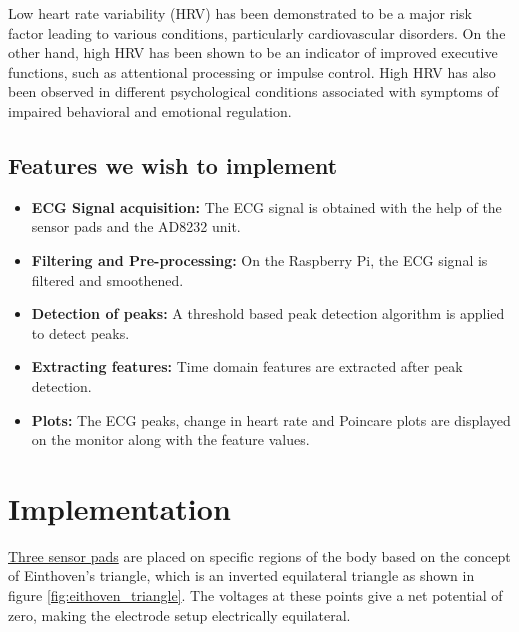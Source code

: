 \documentclass[11pt]{article}
\theoremstyle{definition}
\begin{document}
Low heart rate variability (HRV) has been demonstrated to be a major risk factor leading to various conditions, particularly cardiovascular disorders\cite{kamath1987heart}.
  On the other hand, high HRV has been shown to be an indicator of improved executive functions, such as attentional processing or impulse control\cite{appelhans2006heart, thayer2005psychosomatics}.
  High HRV has also been observed in different psychological conditions associated with symptoms of impaired behavioral and emotional regulation\cite{thayer2009claude, schulz2008negative}.


  \subsection{Features we wish to implement}
  \begin{itemize}
  \item \textbf{ECG Signal acquisition:} The ECG signal is obtained with the help of the sensor pads and the AD8232 unit.
  \item \textbf{Filtering and Pre-processing:} On the Raspberry Pi, the ECG signal is filtered and smoothened. 
  \item \textbf{Detection of peaks:} A threshold based peak detection algorithm is applied to detect peaks.
  \item \textbf{Extracting features:} Time domain features are extracted after peak detection.
  \item \textbf{Plots:} The ECG peaks, change in heart rate and Poincare plots are displayed on the monitor along with the feature values.
  \end{itemize}


  \newpage
  \section{Implementation}
  \underline{Three sensor pads} are placed on specific regions of the body based on the concept of Einthoven’s triangle\cite{abi2019einthoven}, which is an inverted equilateral triangle as shown in figure \ref{fig:eithoven_triangle}. The voltages at these points give a net potential of zero, making the electrode setup electrically equilateral.
\end{document}
